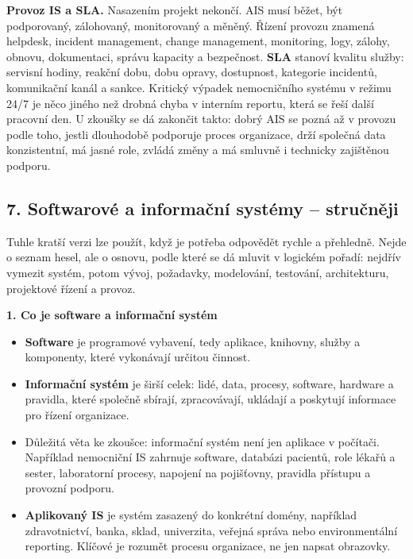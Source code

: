 \begin{greenbox}
\textbf{Provoz IS a SLA.} Nasazením projekt nekončí. AIS musí běžet, být podporovaný, zálohovaný, monitorovaný a měněný. Řízení provozu znamená helpdesk, incident management, change management, monitoring, logy, zálohy, obnovu, dokumentaci, správu kapacity a bezpečnost. \textbf{SLA} stanoví kvalitu služby: servisní hodiny, reakční dobu, dobu opravy, dostupnost, kategorie incidentů, komunikační kanál a sankce. Kritický výpadek nemocničního systému v režimu 24/7 je něco jiného než drobná chyba v interním reportu, která se řeší další pracovní den. U zkoušky se dá zakončit takto: dobrý AIS se pozná až v provozu podle toho, jestli dlouhodobě podporuje proces organizace, drží společná data konzistentní, má jasné role, zvládá změny a má smluvně i technicky zajištěnou podporu.
\end{greenbox}

\subsection*{7. Softwarové a informační systémy -- stručněji}
Tuhle kratší verzi lze použít, když je potřeba odpovědět rychle a přehledně. Nejde o seznam hesel, ale o osnovu, podle které se dá mluvit v logickém pořadí: nejdřív vymezit systém, potom vývoj, požadavky, modelování, testování, architekturu, projektové řízení a provoz.

\textbf{1. Co je software a informační systém}
\begin{itemize}
  \item \textbf{Software} je programové vybavení, tedy aplikace, knihovny, služby a komponenty, které vykonávají určitou činnost.
  \item \textbf{Informační systém} je širší celek: lidé, data, procesy, software, hardware a pravidla, které společně sbírají, zpracovávají, ukládají a poskytují informace pro řízení organizace.
  \item Důležitá věta ke zkoušce: informační systém není jen aplikace v počítači. Například nemocniční IS zahrnuje software, databázi pacientů, role lékařů a sester, laboratorní procesy, napojení na pojišťovny, pravidla přístupu a provozní podporu.
  \item \textbf{Aplikovaný IS} je systém zasazený do konkrétní domény, například zdravotnictví, banka, sklad, univerzita, veřejná správa nebo environmentální reporting. Klíčové je rozumět procesu organizace, ne jen napsat obrazovky.
\end{itemize}

